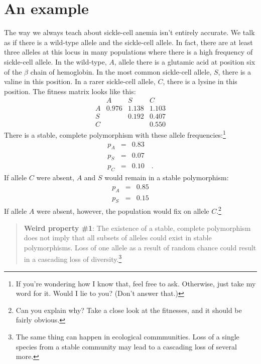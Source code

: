 \documentclass[12pt]{article}
\begin{document}
\section*{An example}

The way we always teach about sickle-cell anemia isn't entirely
accurate. We talk as if there is a wild-type allele and the
sickle-cell allele. In fact, there are at least three alleles at this
locus in many populations where there is a high frequency of
sickle-cell allele. In the wild-type, $A$, allele there is a glutamic
acid at position six of the $\beta$ chain of hemoglobin. In the most
common sickle-cell allele, $S$, there is a valine in this position. In
a rarer sickle-cell allele, $C$, there is a lysine in this
position. The fitness matrix looks like this:
\[
\begin{array}{cccc}
  & A     & S     & C \\
A & 0.976 & 1.138 & 1.103 \\
S &       & 0.192 & 0.407 \\
C &       &       & 0.550
\end{array}
\]
There is a stable, complete polymorphism with these allele
frequencies:\footnote{If you're wondering how I know that, feel free
  to ask. Otherwise, just take my word for it. Would I lie to you?
  (Don't answer that.)}
\begin{eqnarray*}
p_A &=& 0.83 \\
p_S &=& 0.07 \\
p_C &=& 0.10 \quad .
\end{eqnarray*}
If allele $C$ were absent, $A$ and $S$ would remain in a stable
polymorphism:
\begin{eqnarray*}
p_A &=& 0.85 \\
p_S &=& 0.15
\end{eqnarray*}
If allele $A$ were absent, however, the population would fix on allele
$C$.\footnote{Can you explain why? Take a close look at the fitnesses,
  and it should be fairly obvious.}

\begin{quote} {\bf Weird property \#1}: The existence of a stable,
  complete polymorphism does not imply that all subsets of alleles
  could exist in stable polymorphisms. Loss of one allele as a result
  of random chance could result in a cascading loss of
  diversity.\footnote{The same thing can happen in ecological
    commmunities. Loss of a single species from a stable community may
    lead to a cascading loss of several more.}
\end{quote}
\end{document}
